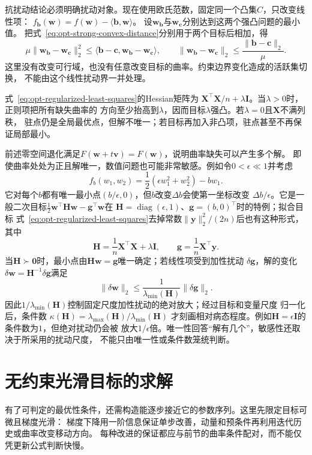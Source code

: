 抗扰动结论必须明确扰动对象。现在使用欧氏范数，固定同一个凸集$C$，只改变线性项：
$f_{\bm b}(\bm w)=f(\bm w)-\langle\bm b,\bm w\rangle$。
设$\bm w_{\bm b}$与$\bm w_{\bm c}$分别达到这两个强凸问题的最小值。
把式~\eqref{eq:opt-strong-convex-distance}分别用于两个目标后相加，得
\[
 \mu\|\bm w_{\bm b}-\bm w_{\bm c}\|_2^2
 \leq\langle\bm b-\bm c,\bm w_{\bm b}-\bm w_{\bm c}\rangle,
 \qquad
 \|\bm w_{\bm b}-\bm w_{\bm c}\|_2\leq\frac{\|\bm b-\bm c\|_2}{\mu}.
\]
这里没有改变可行域，也没有任意改变目标的曲率。约束边界变化造成的活跃集切换，
不能由这个线性扰动界一并处理。

式~\eqref{eq:opt-regularized-least-squares}的Hessian矩阵为
$\bm{X}^{\top}\bm{X}/n+\lambda\bm{I}$。当$\lambda>0$时，正则项把所有缺失曲率的
方向至少抬高到$\lambda$，因而目标$\lambda$强凸。若$\lambda=0$且$\bm{X}$不满列秩，
驻点仍是全局最优点，但解不唯一；若目标再加入非凸项，驻点甚至不再保证局部最小。

前述零空间退化满足$F(\bm w+t\bm v)=F(\bm w)$，说明曲率缺失可以产生多个解。
即使曲率处处为正且解唯一，数值问题也可能非常敏感。例如令$0<\epsilon\ll1$并考虑
\[
  f_b(w_1,w_2)=\frac12(\epsilon w_1^2+w_2^2)-bw_1.
\]
它对每个$b$都有唯一最小点$(b/\epsilon,0)$，但$b$改变$\Delta b$会使第一坐标改变
$\Delta b/\epsilon$。它是一般二次目标$\frac12\bm w^\top\bm H\bm w-\bm g^\top\bm w$在
$\bm H=\operatorname{diag}(\epsilon,1)$、$\bm g=(b,0)^\top$时的特例；拟合目标
式~\eqref{eq:opt-regularized-least-squares}去掉常数$\lVert\bm y\rVert_2^2/(2n)$后也有这种形式，其中
\[
  \bm{H}=\frac{1}{n}\bm{X}^{\top}\bm{X}+\lambda\bm{I},\qquad
  \bm g=\frac1n\bm X^\top\bm y.
\]
当$\bm{H}\succ\bm{0}$时，最小点由$\bm H\bm w=\bm g$唯一确定；若线性项受到加性扰动
$\delta\bm{g}$，解的变化$\delta\bm w=\bm H^{-1}\delta\bm g$满足
\[
  \lVert\delta\bm{w}\rVert_2
  \leq
  \frac{1}{\lambda_{\min}(\bm{H})}
  \lVert\delta\bm{g}\rVert_2.
\]
因此$1/\lambda_{\min}(\bm{H})$控制固定尺度加性扰动的绝对放大；经过目标和变量尺度
归一化后，条件数
$\kappa(\bm{H})=\lambda_{\max}(\bm{H})/\lambda_{\min}(\bm{H})$
才刻画相对病态程度。例如$\bm{H}=\epsilon\bm{I}$的条件数为$1$，但绝对扰动仍会被
放大$1/\epsilon$倍。唯一性回答“解有几个”，敏感性还取决于所采用的扰动尺度，
不能只由唯一性或条件数笼统判断。

\section{无约束光滑目标的求解}
\label{sec:opt-smooth-iterative-methods}

有了可判定的最优性条件，还需构造能逐步接近它的参数序列。这里先限定目标可微且梯度光滑：
梯度下降用一阶信息保证单步改善，动量和预条件再利用迭代历史或曲率改变移动方向。
每种改进的保证都应与前节的曲率条件配对，而不能仅凭更新公式判断快慢。

